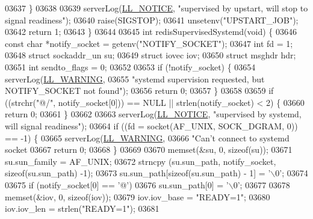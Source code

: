 \begin{DoxyCode}
{{{{{{{{{{{{{{{{{{{{{{{{{{{{{{{{{{{{{{{{{{{{{{{{{{{{{{{{{{{{{{{{{{{{{{{{{{{{{{{{{{{{{{{{{{{{{{{{{{{{{{{{{{{{{{{{{{{{{{{{{{{{{{{{{{{{{{{{{{{{{{{{{{{{{{{{{{{{{{{{{{{{{{{{{{{{{{{{{03637     \}
03638 
03639     serverLog(\hyperlink{server_8h_a8c54c191e436c7dd3012167212692401}{LL\_NOTICE}, \textcolor{stringliteral}{"supervised by upstart, will stop to signal readiness"});
03640     raise(SIGSTOP);
03641     unsetenv(\textcolor{stringliteral}{"UPSTART\_JOB"});
03642     \textcolor{keywordflow}{return} 1;
03643 \}
03644 
03645 \textcolor{keywordtype}{int} redisSupervisedSystemd(\textcolor{keywordtype}{void}) \{
03646     \textcolor{keyword}{const} \textcolor{keywordtype}{char} *notify\_socket = getenv(\textcolor{stringliteral}{"NOTIFY\_SOCKET"});
03647     \textcolor{keywordtype}{int} fd = 1;
03648     \textcolor{keyword}{struct} sockaddr\_un su;
03649     \textcolor{keyword}{struct} iovec iov;
03650     \textcolor{keyword}{struct} msghdr hdr;
03651     \textcolor{keywordtype}{int} sendto\_flags = 0;
03652 
03653     \textcolor{keywordflow}{if} (!notify\_socket) \{
03654         serverLog(\hyperlink{server_8h_a31229b9334bba7d6be2a72970967a14b}{LL\_WARNING},
03655                 \textcolor{stringliteral}{"systemd supervision requested, but NOTIFY\_SOCKET not found"});
03656         \textcolor{keywordflow}{return} 0;
03657     \}
03658 
03659     \textcolor{keywordflow}{if} ((strchr(\textcolor{stringliteral}{"@/"}, notify\_socket[0])) == NULL || strlen(notify\_socket) < 2) \{
03660         \textcolor{keywordflow}{return} 0;
03661     \}
03662 
03663     serverLog(\hyperlink{server_8h_a8c54c191e436c7dd3012167212692401}{LL\_NOTICE}, \textcolor{stringliteral}{"supervised by systemd, will signal readiness"});
03664     \textcolor{keywordflow}{if} ((fd = socket(AF\_UNIX, SOCK\_DGRAM, 0)) == -1) \{
03665         serverLog(\hyperlink{server_8h_a31229b9334bba7d6be2a72970967a14b}{LL\_WARNING},
03666                 \textcolor{stringliteral}{"Can't connect to systemd socket %
03667         \textcolor{keywordflow}{return} 0;
03668     \}
03669 
03670     memset(&su, 0, \textcolor{keyword}{sizeof}(su));
03671     su.sun\_family = AF\_UNIX;
03672     strncpy (su.sun\_path, notify\_socket, \textcolor{keyword}{sizeof}(su.sun\_path) -1);
03673     su.sun\_path[\textcolor{keyword}{sizeof}(su.sun\_path) - 1] = \textcolor{stringliteral}{'\(\backslash\)0'};
03674 
03675     \textcolor{keywordflow}{if} (notify\_socket[0] == \textcolor{stringliteral}{'@'})
03676         su.sun\_path[0] = \textcolor{stringliteral}{'\(\backslash\)0'};
03677 
03678     memset(&iov, 0, \textcolor{keyword}{sizeof}(iov));
03679     iov.iov\_base = \textcolor{stringliteral}{"READY=1"};
03680     iov.iov\_len = strlen(\textcolor{stringliteral}{"READY=1"});
03681 
}}}}}}}}}}}}}}}}}}}}}}}}}}}}}}}}}}}}}}}}}}}}}}}}}}}}}}}}}}}}}}}}}}}}}}}}}}}}}}}}}}}}}}}}}}}}}}}}}}}}}}}}}}}}}}}}}}}}}}}}}}}}}}}}}}}}}}}}}}}}}}}}}}}}}}}}}}}}}}}}}}}}}}}}}}}}}}}}}}
\end{DoxyCode}
